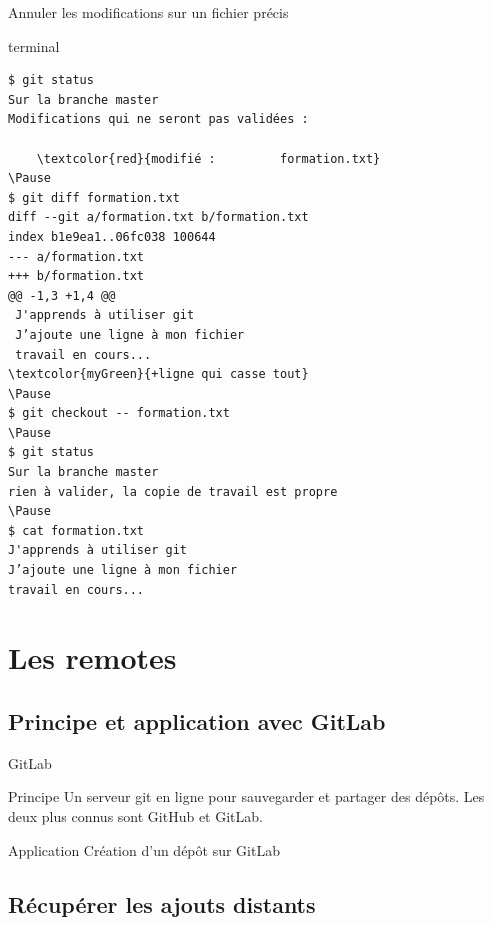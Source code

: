 \documentclass[usepdftitle=false]{beamer}
\def\seplength{.3\topsep}
\newcommand{\Pause}{%
\ifdef{\Release}
  {\pause}
  {}
}
\begin{document}
\begin{frame}[fragile]{Annuler les modifications sur un fichier précis}
	\begin{beamercolorbox}[rounded=true,shadow=true]{terminal}
\vspace{-\seplength}
\begin{Verbatim}
$ git status
Sur la branche master
Modifications qui ne seront pas validées :

	\textcolor{red}{modifié :         formation.txt}
\Pause
$ git diff formation.txt
diff --git a/formation.txt b/formation.txt
index b1e9ea1..06fc038 100644
--- a/formation.txt
+++ b/formation.txt
@@ -1,3 +1,4 @@
 J'apprends à utiliser git
 J’ajoute une ligne à mon fichier
 travail en cours...
\textcolor{myGreen}{+ligne qui casse tout}
\Pause
$ git checkout -- formation.txt
\Pause
$ git status
Sur la branche master
rien à valider, la copie de travail est propre
\Pause
$ cat formation.txt
J'apprends à utiliser git
J’ajoute une ligne à mon fichier
travail en cours...
\end{Verbatim}
	\end{beamercolorbox}
\end{frame}

\section{Les remotes}

\subsection{Principe et application avec GitLab}

\begin{frame}{GitLab}
	\begin{block}{Principe}
		Un serveur git en ligne pour sauvegarder et partager des dépôts. Les deux plus connus sont GitHub et GitLab.
	\end{block}

	\bigskip

	\begin{block}{Application}
		Création d'un dépôt sur GitLab
	\end{block}
\end{frame}

\subsection{Récupérer les ajouts distants}
\end{document}
